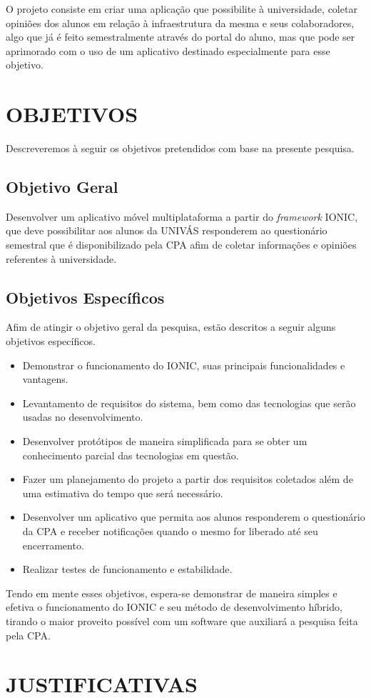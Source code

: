 	\par O projeto consiste em criar uma aplicação que possibilite à universidade, coletar opiniões dos alunos em relação à infraestrutura da mesma e seus colaboradores, algo que já é feito semestralmente através do portal do aluno, mas que pode ser aprimorado com o uso de um aplicativo destinado especialmente para esse objetivo.


\chapter{OBJETIVOS}

	\par Descreveremos à seguir os objetivos pretendidos com base na presente pesquisa.

\section{Objetivo Geral}

	\par Desenvolver um aplicativo móvel multiplataforma a partir do \textit{framework} IONIC, que deve possibilitar aos alunos da UNIVÁS responderem ao questionário semestral que é disponibilizado pela CPA afim de coletar informações e opiniões referentes à universidade.

\section{Objetivos Específicos}

	\par Afim de atingir o objetivo geral da pesquisa, estão descritos a seguir alguns objetivos específicos.
	\begin{itemize}
		\item Demonstrar o funcionamento do IONIC, suas principais funcionalidades e vantagens.
		\item Levantamento de requisitos do sistema, bem como das tecnologias que serão usadas no desenvolvimento.
		\item Desenvolver protótipos de maneira simplificada para se obter um conhecimento parcial das tecnologias em questão.
		\item Fazer um planejamento do projeto a partir dos requisitos coletados além de uma estimativa do tempo que será necessário.
		\item Desenvolver um aplicativo que permita aos alunos responderem o questionário da CPA e receber notificações quando o mesmo for liberado até seu encerramento.
		\item Realizar testes de funcionamento e estabilidade.
	\end{itemize}
	\par Tendo em mente esses objetivos, espera-se demonstrar de maneira simples e efetiva o funcionamento do IONIC e seu método de desenvolvimento híbrido, tirando o maior proveito possível com um software que auxiliará a pesquisa feita pela CPA.

\chapter{JUSTIFICATIVAS}

